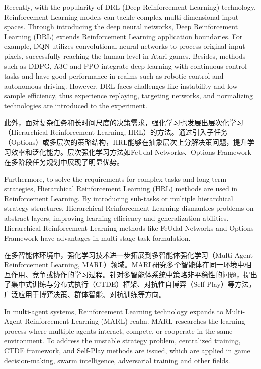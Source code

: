 Recently, with the popularity of DRL (Deep Reinforcement Learning)\cite{li2019deep} technology, Reinforcement Learning models can tackle complex multi-dimensional input spaces. Through introducing the deep neural networks, Deep Reinforcement Learning (DRL) extends Reinforcement Learning application boundaries. For example, DQN utilizes convolutional neural networks to process original input pixels, successfully reaching the human level in Atari games. Besides, methods such as DDPG, A3C and PPO integrate deep learning with continuous control tasks and have good performance in realms such as robotic control and autonomous driving. However, DRL faces challenges like instability and low sample efficiency, thus experience replaying, targeting networks, and normalizing technologies are introduced to the experiment.

此外，面对复杂任务和长时间尺度的决策需求，强化学习也发展出层次化学习（Hierarchical Reinforcement Learning, HRL）\cite{nachum2018data}的方法。通过引入子任务（Options）或多层次的策略结构，HRL能够在抽象层次上分解决策问题，提升学习效率和泛化能力。层次强化学习方法如FeUdal Networks、Options Framework在多阶段任务规划中展现了明显优势。

Furthermore, to solve the requirements for complex tasks and long-term strategies, Hierarchical Reinforcement Learning (HRL) methods are used in Reinforcement Learning\cite{nachum2018data}. By introducing sub-tasks or multiple hierarchical strategy structures, Hierarchical Reinforcement Learning dismantles problems on abstract layers, improving learning efficiency and generalization abilities. Hierarchical Reinforcement Learning methods like FeUdal Networks and Options Framework have advantages in multi-stage task formulation.

在多智能体环境中，强化学习技术进一步拓展到多智能体强化学习（Multi-Agent Reinforcement Learning, MARL）领域。MARL研究多个智能体在同一环境中相互作用、竞争或协作的学习过程。针对多智能体系统中策略非平稳性的问题，提出了集中式训练与分布式执行（CTDE）框架、对抗性自博弈（Self-Play）等方法，广泛应用于博弈决策、群体智能、对抗训练等方向。

In multi-agent systems, Reinforcement Learning technology expands to Multi-Agent Reinforcement Learning (MARL) realm. MARL researches the learning process where multiple agents interact, compete, or cooperate in the same environment. To address the unstable strategy problem, centralized training, CTDE framework, and Self-Play methods are issued, which are applied in game decision-making, swarm intelligence, adversarial training and other fields.

